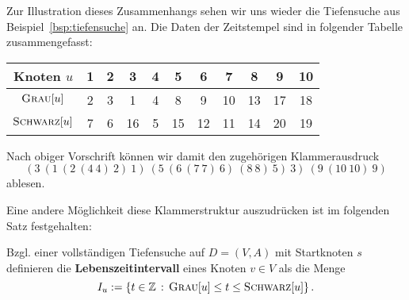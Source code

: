 \begin{bsp} 
Zur Illustration dieses Zusammenhangs sehen wir uns wieder die Tiefensuche aus Beispiel~\ref{bsp:tiefensuche} an.
Die Daten der Zeitstempel sind in folgender Tabelle zusammengefasst:
\begin{table}[H]
\centering
\begin{tabular}{|c|c|c|c|c|c|c|c|c|c|c|}
\hline
\textbf{Knoten $u$}        & \textbf{1} & \textbf{2} & \textbf{3} & \textbf{4} & \textbf{5} & \textbf{6} & \textbf{7} & \textbf{8} & \textbf{9} & \textbf{10} \\ \hline
\textbf{$\mathop{\text{\textsc{Grau}}}[u]$}    & 2          & 3          & 1          & 4          & 8          & 9          & 10         & 13         & 17         & 18          \\ \hline
\textbf{$\mathop{\text{\textsc{Schwarz}}}[u]$} & 7          & 6          & 16         & 5          & 15         & 12         & 11         & 14         & 20         & 19          \\ \hline
\end{tabular}
\end{table}
Nach obiger Vorschrift können wir damit den zugehörigen Klammerausdruck
\[
(3\ (1\ (2\ (4\ 4)\ 2)\ 1)\ (5\ (6\ (7\ 7)\ 6)\ (8\ 8)\ 5)\ 3)\ (9\ (10\ 10)\ 9)
\]
ablesen.

Eine andere Möglichkeit diese Klammerstruktur auszudrücken ist im folgenden Satz festgehalten:
\end{bsp} 

\begin{defn}
	Bzgl. einer vollständigen Tiefensuche auf $D=(V,A)$ mit Startknoten $s$ definieren die \textbf{Lebenszeitintervall} eines Knoten $v \in V$ als die Menge
	\[
			I_u:=\left\{ t \in \mathbb{Z} \,:\,  \mathop{\text{\textsc{Grau}}}[u] \le t \le \mathop{\text{\textsc{Schwarz}}}[u] \right\}. 
	\]
\end{defn} 

